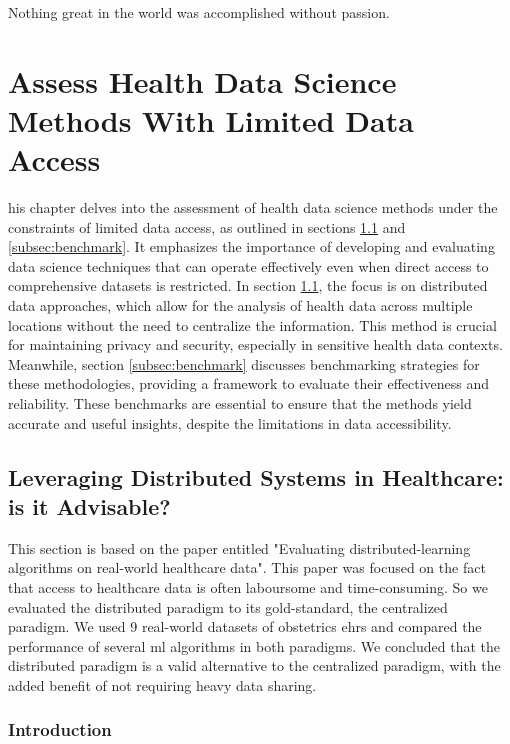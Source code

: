 
\begin{savequote}[85mm]
Nothing great in the world was accomplished 
without passion.
\end{savequote}

\chapter{Assess Health Data Science Methods With Limited Data Access}\label{chap:goal2}
his chapter delves into the assessment of health data science methods under the constraints of limited data access, as outlined in sections \ref{subsec:distributed} and \ref{subsec:benchmark}. It emphasizes the importance of developing and evaluating data science techniques that can operate effectively even when direct access to comprehensive datasets is restricted. In section \ref{subsec:distributed}, the focus is on distributed data approaches, which allow for the analysis of health data across multiple locations without the need to centralize the information. This method is crucial for maintaining privacy and security, especially in sensitive health data contexts. Meanwhile, section \ref{subsec:benchmark} discusses benchmarking strategies for these methodologies, providing a framework to evaluate their effectiveness and reliability. These benchmarks are essential to ensure that the methods yield accurate and useful insights, despite the limitations in data accessibility.


\section{Leveraging Distributed Systems in Healthcare: is it Advisable?}\label{subsec:distributed}
This section is based on the paper entitled "Evaluating distributed-learning algorithms on real-world healthcare data". This paper was focused on the fact that access to healthcare data is often laboursome and time-consuming. So we evaluated the distributed paradigm to its gold-standard, the centralized paradigm. We used 9 real-world datasets of obstetrics \acp{ehr} and compared the performance of several \ac{ml} algorithms in both paradigms. We concluded that the distributed paradigm is a valid alternative to the centralized paradigm, with the added benefit of not requiring heavy data sharing.

\subsection{Introduction}

